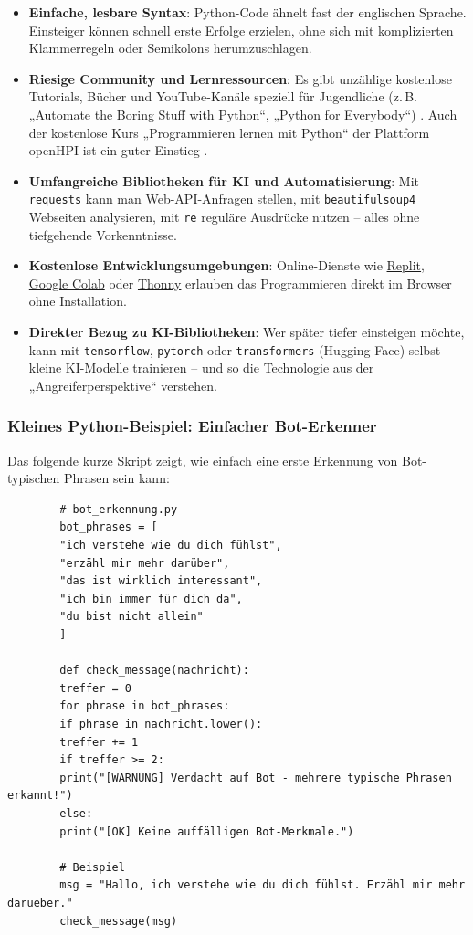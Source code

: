 \documentclass[12pt,a4paper,oneside]{scrartcl}
\begin{document}
	\begin{itemize}
		\item \textbf{Einfache, lesbare Syntax}: Python-Code ähnelt fast der englischen Sprache. Einsteiger können schnell erste Erfolge erzielen, ohne sich mit komplizierten Klammerregeln oder Semikolons herumzuschlagen.
		\item \textbf{Riesige Community und Lernressourcen}: Es gibt unzählige kostenlose Tutorials, Bücher und YouTube-Kanäle speziell für Jugendliche (z.\,B. „Automate the Boring Stuff with Python“, „Python for Everybody“) \cite{CreateLearn2026}. Auch der kostenlose Kurs „Programmieren lernen mit Python“ der Plattform openHPI ist ein guter Einstieg \cite{ClassCentralOpenHPI}.
		\item \textbf{Umfangreiche Bibliotheken für KI und Automatisierung}: Mit \texttt{requests} kann man Web-API-Anfragen stellen, mit \texttt{beautifulsoup4} Webseiten analysieren, mit \texttt{re} reguläre Ausdrücke nutzen – alles ohne tiefgehende Vorkenntnisse.
		\item \textbf{Kostenlose Entwicklungsumgebungen}: Online-Dienste wie \href{https://replit.com}{Replit}, \href{https://colab.research.google.com}{Google Colab} oder \href{https://thonny.org}{Thonny} erlauben das Programmieren direkt im Browser ohne Installation.
		\item \textbf{Direkter Bezug zu KI-Bibliotheken}: Wer später tiefer einsteigen möchte, kann mit \texttt{tensorflow}, \texttt{pytorch} oder \texttt{transformers} (Hugging Face) selbst kleine KI-Modelle trainieren – und so die Technologie aus der „Angreiferperspektive“ verstehen.
	\end{itemize}
	
	\subsubsection{Kleines Python-Beispiel: Einfacher Bot-Erkenner}
	
	Das folgende kurze Skript zeigt, wie einfach eine erste Erkennung von Bot-typischen Phrasen sein kann:
	
	\begin{verbatim}
		# bot_erkennung.py
		bot_phrases = [
		"ich verstehe wie du dich fühlst",
		"erzähl mir mehr darüber",
		"das ist wirklich interessant",
		"ich bin immer für dich da",
		"du bist nicht allein"
		]
		
		def check_message(nachricht):
		treffer = 0
		for phrase in bot_phrases:
		if phrase in nachricht.lower():
		treffer += 1
		if treffer >= 2:
		print("[WARNUNG] Verdacht auf Bot - mehrere typische Phrasen erkannt!")
		else:
		print("[OK] Keine auffälligen Bot-Merkmale.")
		
		# Beispiel
		msg = "Hallo, ich verstehe wie du dich fühlst. Erzähl mir mehr darueber."
		check_message(msg)
	\end{verbatim}
	
\end{document}
